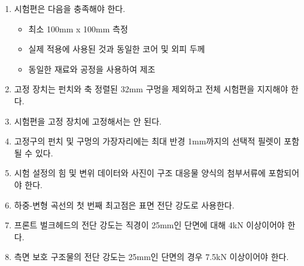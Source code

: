 \documentclass[final,a4paper,10pt]{report}
\begin{document}
\begin{enumerate}
\begin{enumerate}
\begin{enumerate}
          \item\label{rule:formula-technical.alternative-materials.testing.peripheral-shear-test.specimen-construction} 시험편은 다음을 충족해야 한다.
            \begin{itemize}
                \item 최소 100mm x 100mm 측정
                \item 실제 적용에 사용된 것과 동일한 코어 및 외피 두께
                \item 동일한 재료와 공정을 사용하여 제조
            \end{itemize}

          \item\label{rule:formula-technical.alternative-materials.testing.peripheral-shear-test.fixture-hole-diameter-32mm} 고정 장치는 펀치와 축 정렬된 32mm 구멍을 제외하고 전체 시험편을 지지해야 한다.
          \item\label{rule:formula-technical.alternative-materials.testing.peripheral-shear-test.specimen-not-clamped} 시험편을 고정 장치에 고정해서는 안 된다.
          \item\label{rule:formula-technical.alternative-materials.testing.peripheral-shear-test.optional-edge-fillet-1mm} 고정구의 펀치 및 구멍의 가장자리에는 최대 반경 1mm까지의 선택적 필렛이 포함될 수 있다.
          \item\label{rule:formula-technical.alternative-materials.testing.peripheral-shear-test.test-data-and-photos} 시험 설정의 힘 및 변위 데이터와 사진이 구조 대응물 양식의 첨부서류에 포함되어야 한다.
          \item\label{rule:formula-technical.alternative-materials.testing.peripheral-shear-test.first-peak-shear-strength} 하중-변형 곡선의 첫 번째 최고점은 표면 전단 강도로 사용한다.
          \item\label{rule:formula-technical.alternative-materials.testing.peripheral-shear-test.bulkhead-min-shear-4kn} 프론트 벌크헤드의 전단 강도는 직경이 25mm인 단면에 대해 4kN 이상이어야 한다.
          \item\label{rule:formula-technical.alternative-materials.testing.peripheral-shear-test.side-structure-shear-strength} 측면 보호 구조물의 전단 강도는 25mm인 단면의 경우 7.5kN 이상이어야 한다.
        \end{enumerate}


\end{enumerate}
\end{enumerate}
\end{document}

